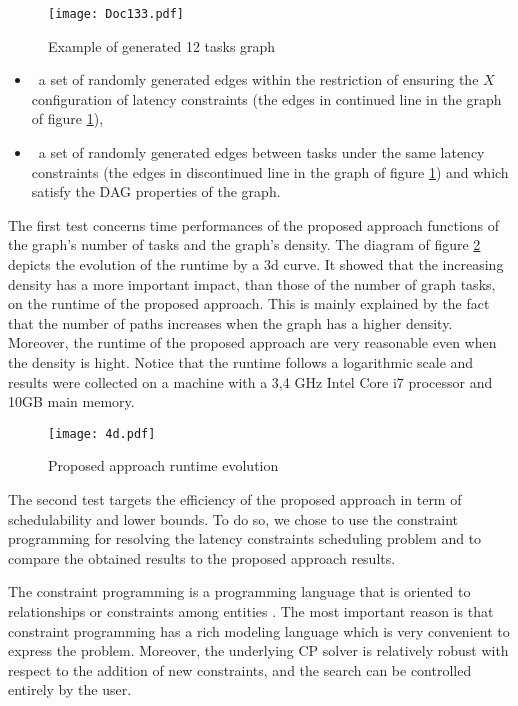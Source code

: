 \documentclass{ijcaArticle}
\begin{document}
\begin{figure}[h!] 
\begin{center} 
\texttt{[image: Doc133.pdf]} 
\caption{Example of generated 12 tasks graph} 
\label{rand} 
\end{center} 
\end{figure}


\begin{itemize}
\item \ a set of randomly generated edges within the restriction of ensuring the $X$ configuration of latency constraints (the edges in continued line in the graph of figure \ref{rand}),   
\item \ a set of randomly generated edges between tasks under the same latency constraints (the edges in discontinued line in the graph of figure \ref{rand}) and which
satisfy the DAG properties of the graph.
\end{itemize}

The first test concerns time performances of the proposed approach functions of the graph\rq{}s number of tasks and the graph\rq{}s density. The diagram of figure \ref{3dcurve} depicts the evolution of the runtime by a 3d curve. It showed that the increasing density has a  more important impact, than those of the number of graph tasks, on the runtime of the proposed approach. This is mainly explained by the fact that the number of paths increases when the graph has a higher density.  Moreover, the runtime of the proposed approach are very reasonable even when the density is  hight.  Notice that the runtime follows a logarithmic scale and results were collected on a machine with a 3,4 GHz Intel Core i7 processor
and 10GB main memory.   


\begin{figure}[h!] 
\begin{center} 
\texttt{[image: 4d.pdf]} 
\caption{Proposed approach runtime evolution} 
\label{3dcurve} 
\end{center} 
\end{figure}


The second test targets the efficiency of the proposed approach in term of schedulability and lower bounds. To do so, we chose to use the constraint programming for resolving the latency constraints scheduling problem and to compare the obtained results to the proposed approach results. 

The constraint programming is a programming language that is oriented to relationships or constraints among entities \cite{Apt:2003:PCP:1237975}.  The most important reason is that constraint programming has a rich modeling language which is very convenient to express the problem. Moreover, the underlying CP solver is relatively robust with respect to the addition of new constraints, and the search can be controlled entirely by the user.
\end{document}
